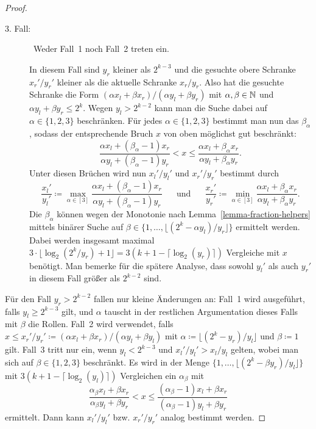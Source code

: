 \begin{proof}
\begin{description}
		\item[3. Fall:]~Weder Fall~1 noch Fall~2 treten ein.
		
			In diesem Fall sind $y_r$ kleiner als $2^{k-3}$ und die gesuchte obere Schranke $x_r'/y_r'$ kleiner als die aktuelle Schranke $x_r/y_r$.
			Also hat die gesuchte Schranke die Form $(\alpha x_l + \beta x_r)/(\alpha y_l + \beta y_r)$ mit $\alpha,\beta\in\mathbb{N}$ und $\alpha y_l + \beta y_r\leq 2^{k}$.
			Wegen $y_l > 2^{k-2}$ kann man die Suche dabei auf $\alpha \in \{ 1, 2, 3 \}$ beschränken.
			Für jedes $\alpha\in\{1,2,3\}$ bestimmt man nun das $\beta_\alpha$, sodass der entsprechende Bruch $x$ von oben möglichst gut beschränkt:
			\[
				\frac{\alpha x_l + (\beta_\alpha - 1) x_r}{\alpha y_l + (\beta_\alpha - 1) y_r} < x \leq \frac{\alpha x_l + \beta_\alpha x_r}{\alpha y_l + \beta_\alpha y_r}.
			\]
			Unter diesen Brüchen wird nun $x_l'/y_l'$ und $x_r'/y_r'$ bestimmt durch
			\[
			\frac{x_l'}{y_l'}\coloneq \max_{\alpha\in[3]} 			\frac{\alpha x_l + (\beta_\alpha - 1)x_r}{\alpha y_l + (\beta_\alpha - 1)y_r}
			\text{~~~~~und~~~~~}
			\frac{x_r'}{y_r'}\coloneq \min_{\alpha\in[3]} \frac{\alpha x_l + \beta_\alpha x_r}{\alpha y_l + \beta_\alpha y_r}.
			\]
			Die $\beta_\alpha$ können wegen der Monotonie nach Lemma~\ref{lemma-fraction-helpers} mittels binärer Suche auf $\beta \in \{1,\dots, \lfloor (2^{k} - \alpha y_l) / y_r \rfloor \}$ ermittelt werden.
			Dabei werden insgesamt maximal $3 \cdot \lfloor \log_2(2^{k} / y_r) + 1 \rfloor = 3 (k+1 - \lceil\log_2(y_r)\rceil)$ Vergleiche mit $x$ benötigt.
			Man bemerke für die spätere Analyse, dass sowohl $y_l'$ als auch $y_r'$ in diesem Fall größer als $2^{k-2}$ sind.
 	\end{description}
 
 	Für den Fall $y_r > 2^{k-2}$ fallen nur kleine Änderungen an:
 	Fall~1 wird ausgeführt, falls $y_l \geq 2^{k-3}$ gilt, und $\alpha$ tauscht in der restlichen Argumentation dieses Falls mit $\beta$ die Rollen.
 	Fall~2 wird verwendet, falls ${x\leq x_r'/y_r'\coloneq (\alpha x_l + \beta x_r) / (\alpha y_l + \beta y_l)}$ mit ${\alpha\coloneq \lfloor (2^k - y_r)/ y_l \rfloor}$ und $\beta\coloneq 1$ gilt.
 	Fall~3 tritt nur ein, wenn $y_l<2^{k-3}$ und ${x_l'/y_l' > x_l/y_l}$ gelten, wobei man sich auf $\beta\in\{1, 2, 3\}$ beschränkt.
 	Es wird in der Menge ${ \{1,\dots, \lfloor ( 2^k - \beta y_r)/y_l \rfloor \} }$ mit $3(k+1-\lceil \log_2(y_l) \rceil)$ Vergleichen ein $\alpha_\beta$ mit \[
 		\frac{\alpha_\beta x_l + \beta x_r}{\alpha_\beta y_l + \beta y_r} < x \leq \frac{(\alpha_\beta - 1) x_l + \beta x_r}{(\alpha_\beta - 1)y_l + \beta y_r}
 	\]
 	ermittelt.
 	Dann kann $x_l'/y_l'$ bzw. $x_r'/y_r'$ analog bestimmt werden.
 	

\end{proof}
